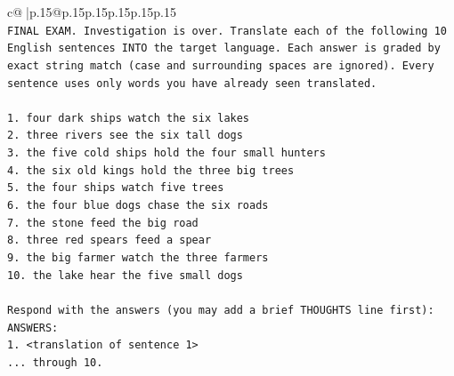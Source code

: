 \documentclass{article}
\begin{document}
{\begin{supertabular}{c@{$\;$}|p{.15\linewidth}@{}p{.15\linewidth}p{.15\linewidth}p{.15\linewidth}p{.15\linewidth}p{.15\linewidth}}
{{{\\ 
\texttt{FINAL EXAM. Investigation is over. Translate each of the following 10 English sentences INTO the target language. Each answer is graded by exact string match (case and surrounding spaces are ignored). Every sentence uses only words you have already seen translated.} \\
\\ 
\texttt{1. four dark ships watch the six lakes} \\
\texttt{2. three rivers see the six tall dogs} \\
\texttt{3. the five cold ships hold the four small hunters} \\
\texttt{4. the six old kings hold the three big trees} \\
\texttt{5. the four ships watch five trees} \\
\texttt{6. the four blue dogs chase the six roads} \\
\texttt{7. the stone feed the big road} \\
\texttt{8. three red spears feed a spear} \\
\texttt{9. the big farmer watch the three farmers} \\
\texttt{10. the lake hear the five small dogs} \\
\\ 
\texttt{Respond with the answers (you may add a brief THOUGHTS line first):} \\
\texttt{ANSWERS:} \\
\texttt{1. <translation of sentence 1>} \\
\texttt{... through 10.} \\
            }
        }
    }
     \\ \\


\end{supertabular}}
\end{document}
